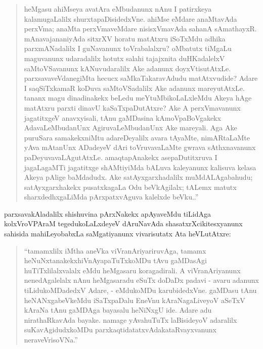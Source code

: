 \begin{quote}
heMgasu ahiMseya avatAra eMbudanunx nAnu I patirxkeya kalamu\-gaLalilx shurxta\-paDisidedxVne. ahiMse eMdare anaMtavAda perxVma; anaMta perxVmaveMdare nisisxVmavAda sahanA sAmathayxR. mAnavajananiyAda sitxrXV horatu matAtxru iSoTxMdu adhika parxmANadalilx I guNa\-vanunx toVrabalalxru? oMbatutx tiMgaLu maguvanunx udaradalilx hotutx salahi tajajxnita duHKadalelxV saMtoVSavanunx kANuvudaralilx Ake adanunx doyxVtisutAtxLe. parxsavaveVdanegiMta hecucx saMkaTakaravAdudu matAtxvudide? Adare I saqSiTxkamaR koDuva saMtoVSadalilx Ake adanunx mareyutAtxLe. tananx magu dinadinakekx beLedu meYtuMbikoLaLxleMdu Akeya hAge matAtxru parxti dinavU kaSaTxpaDutAtxre? Ake A perxVmavanunx jagatitxgeV anavxyisali, tAnu gaMDasina kAmoVpaBoVgakekx AdavaLeMbudanUnx AgiruvaLeMbudanUnx Ake mareyali. Aga Ake puruSara samakekxniMtu adareDeyalilx avara tAyaMte, nimARtaLaMte yAva mAtanUnx ADadeyeV dAri toVruvavaLaMte gwrava sAthxnavanunx paDeyuvavaLAgutAtxLe. amaqtapAnakekx asepaDutitxruva I jagaLagaMTi jagatitxge shAMtiyiMda bALuva kaleyanunx kalisuva kelasa Akeya pAlige baMdadudx. Ake satAyxgarxhadalilx  muMdALAgabahudu; satAyxgarxhakekx pusatxkagaLa Odu beVkAgilalx; tALemx matutx sharxdedhxgaLiMda pArxpatxvAguva kalelxde beVku..''
\end{quote}

parxsavakAladalilx shishuvina pArxNakekx apAyaveMdu tiLidAga kolxVroVPAraM tegedu\-koLaLxdeyeV dAruNavAda shasatxrXcikitesxyanunx sahisida mahiLeyobabxLa saMgatiyanunx vivarisutatx Ata heVLutAtxre:
\begin{quote}
``tamamxlilx iMtha aneVka viVranAriyariruvAga, tamamx heNuNxtanakekx\break hiVnAyapaTuTxkoMDu tAvu gaMDasAgi huTiTxlilalxvalalx eMdu heMga\-saru koragadirali. A viVranAriyanunx nenedAgalelalx nAnu heMgasaradu eSuTx doDaDx padavi - avaru adanunx tiLidukoMDadedxV Adare, - eMdukoMDu karubidedxVne. gaMDasu tAnu heNANxgabeVkeMdu iSaTx\-paDalu EneVnu kAraNagaLiveyoV aSeTxV kAraNa tAnu gaMDAga baya\-salu heNiNxgU ide. Adare adu nirathaRkavAda bayake. namage yAva\break huTuTx laBisideyoV adaralilx suKavAgidudxkoMDu parxkaqtidatatxvAda\break kataRvayxvanunx neraveVrisoVNa.''
\end{quote}

